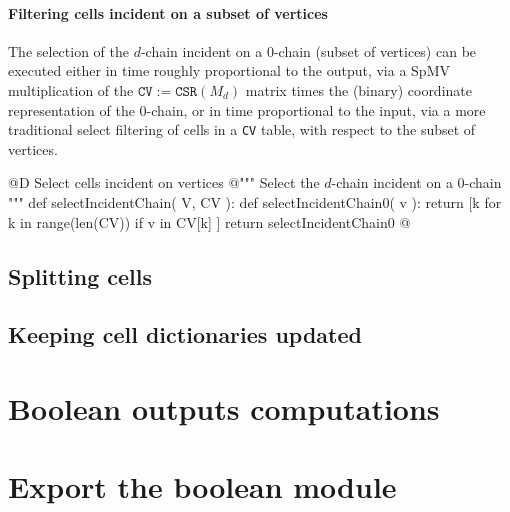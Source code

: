 \documentclass[11pt,oneside]{article}	%
\begin{document}
\paragraph{Filtering cells incident on a subset of vertices}

The selection of the $d$-chain incident on a $0$-chain (subset of vertices) can be executed either in time roughly proportional to the output, via a SpMV multiplication of the $\texttt{CV} := \texttt{CSR}(M_d)$ matrix times the (binary) coordinate representation of the $0$-chain, or in time proportional to the input, via a more traditional select filtering of cells in a \texttt{CV} table, with respect to the subset of vertices.


@D Select cells incident on vertices
@{""" Select the $d$-chain incident on a $0$-chain """
def selectIncidentChain( V, CV ):
	def selectIncidentChain0( v ):
		return [k for k in range(len(CV)) if v in CV[k] ]
	return selectIncidentChain0
@}


\subsection{Splitting cells}
\subsection{Keeping cell dictionaries updated}
\section{Boolean outputs computations}
\section{Export the boolean module}
\end{document}
